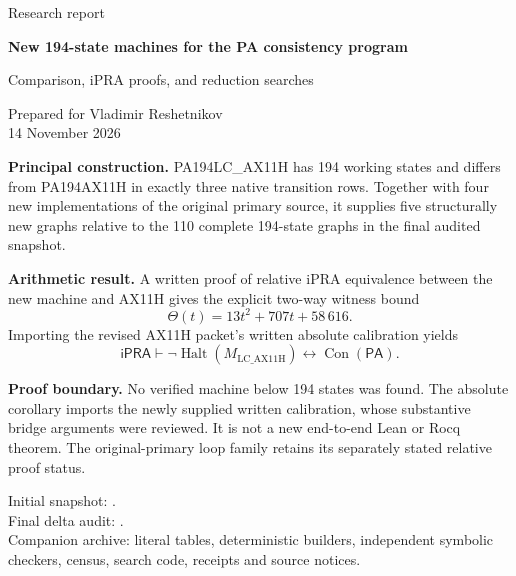 \documentclass[11pt,a4paper]{article}
\newcommand{\ipra}{\mathsf{iPRA}}
\newcommand{\pa}{\mathsf{PA}}
\newcommand{\Con}{\operatorname{Con}}
\newcommand{\Halt}{\operatorname{Halt}}
\newcommand{\MLH}{M_{\mathrm{LC\_AX11H}}}
\begin{document}
\hypersetup{pageanchor=false}
\begin{titlepage}
\color{ink}
\vspace*{14mm}
{\Large Research report}\par
\vspace{12mm}
{\huge\bfseries New 194-state machines for the PA consistency program\par}
\vspace{7mm}
{\Large Comparison, iPRA proofs, and reduction searches\par}
\vspace{15mm}
{\large Prepared for Vladimir Reshetnikov\\14 November 2026}\par
\vspace{15mm}
\begin{minipage}{0.95\textwidth}
\color{black}
\textbf{Principal construction.} PA194LC\_AX11H has 194 working states and
differs from PA194AX11H in exactly three native transition rows. Together
with four new implementations of the original primary source, it supplies
five structurally new graphs relative to the 110 complete 194-state
graphs in the final audited snapshot.

\textbf{Arithmetic result.} A written proof of relative iPRA equivalence
between the new machine and AX11H gives the explicit two-way witness bound
\[
\Theta(t)=13t^2+707t+58\,616.
\]
Importing the revised AX11H packet's written absolute calibration yields
\[
\ipra\vdash\neg\Halt(\MLH)\leftrightarrow\Con(\pa).
\]

\textbf{Proof boundary.} No verified machine below 194 states was found.
The absolute corollary imports the newly supplied written calibration,
whose substantive bridge arguments were reviewed. It is not a new
end-to-end Lean or Rocq theorem. The original-primary loop family retains
its separately stated relative proof status.
\end{minipage}
\vfill
\small Initial snapshot: .\\
Final delta audit: .\\
Companion archive: literal tables, deterministic builders, independent
symbolic checkers, census, search code, receipts and source notices.
\end{titlepage}
\hypersetup{pageanchor=true}
\begingroup
\footnotesize
\setlength{\parskip}{0pt}
\tableofcontents
\endgroup
\clearpage
{}
\end{document}
